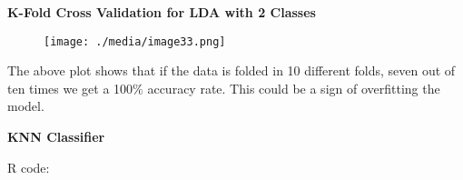 \documentclass[12pt]{article}
\begin{document}
\vspace{\baselineskip}

\vspace{\baselineskip}

\vspace{\baselineskip}

\vspace{\baselineskip}

\vspace{\baselineskip}

\vspace{\baselineskip}

\vspace{\baselineskip}

\vspace{\baselineskip}

\vspace{\baselineskip}

\vspace{\baselineskip}
\begin{justify}
\textbf{K-Fold Cross Validation for LDA with 2 Classes}
\end{justify}\par




\begin{figure}[H]
	\begin{Center}
		\texttt{[image: ./media/image33.png]}
	\end{Center}
\end{figure}



\par

\begin{justify}
The above plot shows that if the data is folded in 10 different folds, seven out of ten times we get a 100$\%$  accuracy rate. This could be a sign of overfitting the model.
\end{justify}\par


\vspace{\baselineskip}
\begin{justify}
\textbf{KNN Classifier }
\end{justify}\par

\begin{justify}
R code:
\end{justify}\par
\end{document}
